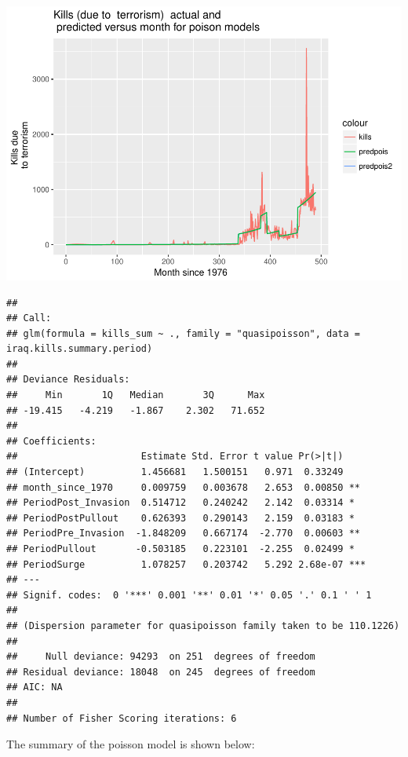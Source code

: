 \documentclass[]{article}
\begin{document}
\includegraphics{Peters_experiment_markdown_files/figure-latex/unnamed-chunk-20-1.pdf}

\begin{verbatim}
## 
## Call:
## glm(formula = kills_sum ~ ., family = "quasipoisson", data = iraq.kills.summary.period)
## 
## Deviance Residuals: 
##     Min       1Q   Median       3Q      Max  
## -19.415   -4.219   -1.867    2.302   71.652  
## 
## Coefficients:
##                      Estimate Std. Error t value Pr(>|t|)    
## (Intercept)          1.456681   1.500151   0.971  0.33249    
## month_since_1970     0.009759   0.003678   2.653  0.00850 ** 
## PeriodPost_Invasion  0.514712   0.240242   2.142  0.03314 *  
## PeriodPostPullout    0.626393   0.290143   2.159  0.03183 *  
## PeriodPre_Invasion  -1.848209   0.667174  -2.770  0.00603 ** 
## PeriodPullout       -0.503185   0.223101  -2.255  0.02499 *  
## PeriodSurge          1.078257   0.203742   5.292 2.68e-07 ***
## ---
## Signif. codes:  0 '***' 0.001 '**' 0.01 '*' 0.05 '.' 0.1 ' ' 1
## 
## (Dispersion parameter for quasipoisson family taken to be 110.1226)
## 
##     Null deviance: 94293  on 251  degrees of freedom
## Residual deviance: 18048  on 245  degrees of freedom
## AIC: NA
## 
## Number of Fisher Scoring iterations: 6
\end{verbatim}

The summary of the poisson model is shown below:
\end{document}
